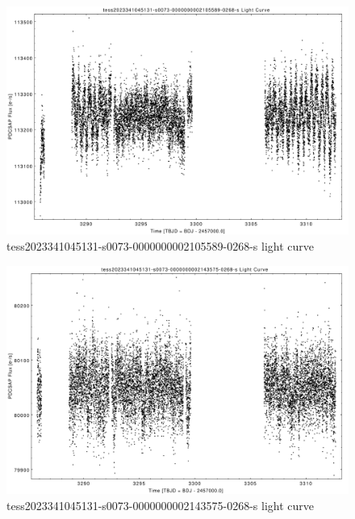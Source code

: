 \documentclass[a4paper,12pt]{article}
\begin{document}
\begin{figure}[htbp]
    \centering
    \includegraphics[width = 1\textwidth]{
      ../lightcurves/tess2023341045131-s0073-0000000002105589-0268-s.pdf}
    \caption{tess2023341045131-s0073-0000000002105589-0268-s light curve}
\end{figure}
\begin{figure}[htbp]
    \centering
    \includegraphics[width = 1\textwidth]{
      ../lightcurves/tess2023341045131-s0073-0000000002143575-0268-s.pdf}
    \caption{tess2023341045131-s0073-0000000002143575-0268-s light curve}
\end{figure}
\end{document}

